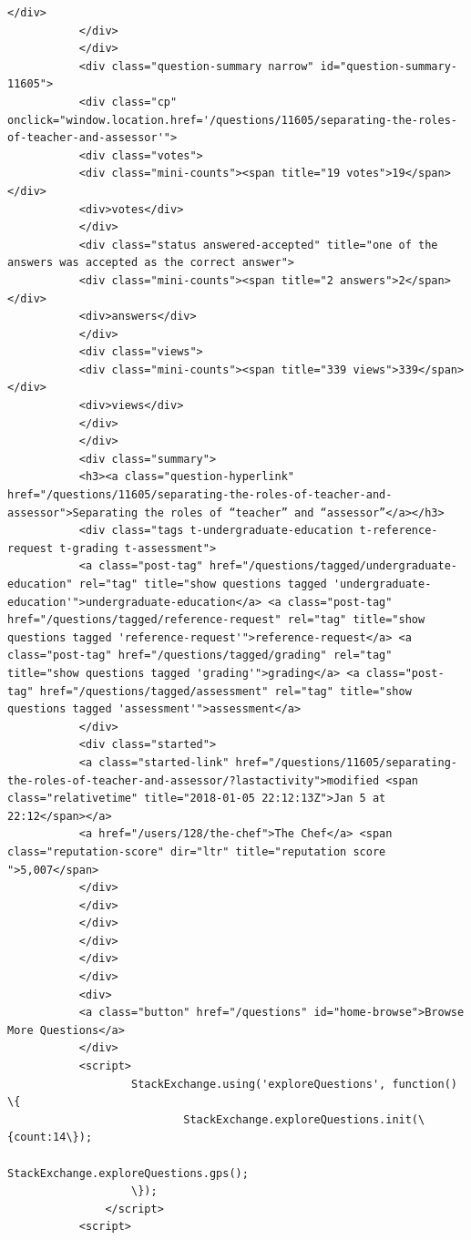 \documentclass[11pt]{article}
\begin{document}
\begin{Verbatim}[commandchars=\\\{\}]
           </div>
           </div>
           </div>
           <div class="question-summary narrow" id="question-summary-11605">
           <div class="cp" onclick="window.location.href='/questions/11605/separating-the-roles-of-teacher-and-assessor'">
           <div class="votes">
           <div class="mini-counts"><span title="19 votes">19</span></div>
           <div>votes</div>
           </div>
           <div class="status answered-accepted" title="one of the answers was accepted as the correct answer">
           <div class="mini-counts"><span title="2 answers">2</span></div>
           <div>answers</div>
           </div>
           <div class="views">
           <div class="mini-counts"><span title="339 views">339</span></div>
           <div>views</div>
           </div>
           </div>
           <div class="summary">
           <h3><a class="question-hyperlink" href="/questions/11605/separating-the-roles-of-teacher-and-assessor">Separating the roles of “teacher” and “assessor”</a></h3>
           <div class="tags t-undergraduate-education t-reference-request t-grading t-assessment">
           <a class="post-tag" href="/questions/tagged/undergraduate-education" rel="tag" title="show questions tagged 'undergraduate-education'">undergraduate-education</a> <a class="post-tag" href="/questions/tagged/reference-request" rel="tag" title="show questions tagged 'reference-request'">reference-request</a> <a class="post-tag" href="/questions/tagged/grading" rel="tag" title="show questions tagged 'grading'">grading</a> <a class="post-tag" href="/questions/tagged/assessment" rel="tag" title="show questions tagged 'assessment'">assessment</a>
           </div>
           <div class="started">
           <a class="started-link" href="/questions/11605/separating-the-roles-of-teacher-and-assessor/?lastactivity">modified <span class="relativetime" title="2018-01-05 22:12:13Z">Jan 5 at 22:12</span></a>
           <a href="/users/128/the-chef">The Chef</a> <span class="reputation-score" dir="ltr" title="reputation score ">5,007</span>
           </div>
           </div>
           </div>
           </div>
           </div>
           </div>
           <div>
           <a class="button" href="/questions" id="home-browse">Browse More Questions</a>
           </div>
           <script>
                   StackExchange.using('exploreQuestions', function() \{
                           StackExchange.exploreQuestions.init(\{count:14\});
                                       StackExchange.exploreQuestions.gps();
                   \});
               </script>
           <script>

\end{Verbatim}
\end{document}

